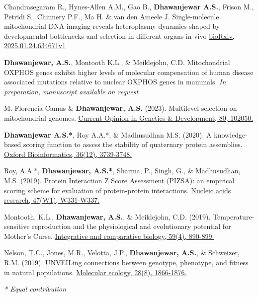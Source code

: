 


\begin{cvpubs}

\vspace{-1mm}


  \pubentry
    {Chandrasegaram R., Hynes-Allen A.M., Gao B., \textbf{Dhawanjewar A.S.}, Frison M., Petridi S., Chinnery P.F., Ma H. \& van den Ameele J.}
  {Single-molecule mitochondrial DNA imaging reveals heteroplasmy dynamics shaped by developmental bottlenecks and selection in different organs in vivo}
  {\href{https://doi.org/10.1101/2025.01.24.634671}{bioRxiv, 2025.01.24.634671v1}}

  \pubentry
    {\textbf{Dhawanjewar, A.S.}, Montooth K.L., \& Meiklejohn, C.D.}
  {Mitochondrial OXPHOS genes exhibit higher levels of molecular compensation of human disease associated mutations relative to nuclear OXPHOS genes in mammals.}
  {\textit{In preparation, manuscript available on request}}

  \pubentry
    {M. Florencia Camus \& \textbf{Dhawanjewar, A.S.} (2023).}
  {Multilevel selection on mitochondrial genomes.}
  {\href{https://doi.org/10.1016/j.gde.2023.102050}{Current Opinion in Genetics \& Development, 80, 102050.}}

  \pubentry
    {\textbf{Dhawanjewar A.S.*}, Roy A.A.*, \& Madhusudhan M.S. (2020).}
	{A knowledge-based scoring function to assess the stability of quaternary protein assemblies.}
	{\href{https://doi.org/10.1101/562520}{Oxford Bioinformatics, 36(12), 3739-3748.}}

  \pubentry
     {Roy, A.A.*, \textbf{Dhawanjewar, A.S.*}, Sharma, P., Singh, G., \& Madhusudhan, M.S. (2019).}
  	{Protein Interaction Z Score Assessment (PIZSA): an empirical scoring scheme for evaluation of protein-protein interactions.}
	{\href{https://doi.org/10.1093/nar/gkz368}{Nucleic acids research, 47(W1), W331-W337.}}

  \pubentry
    {Montooth, K.L., \textbf{Dhawanjewar, A.S.}, \& Meiklejohn, C.D. (2019).}
	{Temperature-sensitive reproduction and the physiological and evolutionary potential for Mother's Curse.}	{\href{https://doi.org/10.1093/icb/icz091}{Integrative and comparative biology, 59(4), 890-899.}}

  \pubentry
    {Nelson, T.C., Jones, M.R., Velotta, J.P., \textbf{Dhawanjewar, A.S.}, \& Schweizer, R.M. (2019).}
	{UNVEILing connections between genotype, phenotype, and fitness in natural populations.}
	{\href{https://doi.org/10.1111/mec.15067}{Molecular ecology, 28(8), 1866-1876.}}

	\fontsize{10pt}{1em}\bodyfontlight\itshape\color{graytext} * Equal contribution

\end{cvpubs}

